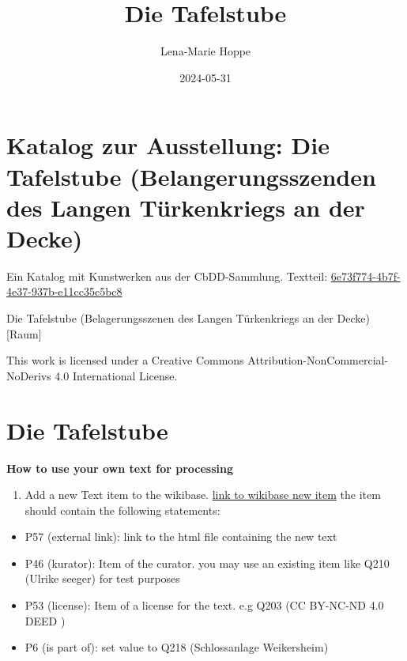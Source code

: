 \documentclass[
  letterpaper,
]{book}
\title{Die Tafelstube}
\author{Lena-Marie Hoppe}
\date{2024-05-31}
\providecommand{\tightlist}{%
  \setlength{\itemsep}{0pt}\setlength{\parskip}{0pt}}\usepackage{longtable,booktabs,array}
\renewcommand*\contentsname{Table of contents}
\newcommand\contentsname{Table of contents}
\begin{document}
\frontmatter
\maketitle

\renewcommand*\contentsname{Table of contents}
{
\setcounter{tocdepth}{2}
\tableofcontents
}
\mainmatter
{}

\chapter{Katalog zur Ausstellung: Die Tafelstube (Belangerungsszenden
des Langen Türkenkriegs an der
Decke)}\label{katalog-zur-ausstellung-die-tafelstube-belangerungsszenden-des-langen-tuxfcrkenkriegs-an-der-decke}

Ein Katalog mit Kunstwerken aus der CbDD-Sammlung. Textteil:
\href{https://www.deckenmalerei.eu/42d06165-58e7-4653-bfe4-3d5f7091fc33\#6e73f774-4b7f-4e37-937b-e11cc35c5bc8}{6e73f774-4b7f-4e37-937b-e11cc35c5bc8}

Die Tafelstube (Belagerungsszenen des Langen Türkenkriegs an der Decke)
{[}Raum{]}

This work is licensed under a Creative Commons
Attribution-NonCommercial-NoDerivs 4.0 International License.


\chapter{Die Tafelstube}\label{die-tafelstube}

\textbf{How to use your own text for processing}

\begin{enumerate}
\def\labelenumi{\arabic{enumi}.}
\tightlist
\item
  Add a new Text item to the wikibase.
  \href{https://computational-publishing-service.wikibase.cloud/wiki/Special:NewItem}{link
  to wikibase new item} the item should contain the following
  statements:
\end{enumerate}

\begin{itemize}
\tightlist
\item
  P57 (external link): link to the html file containing the new text
\item
  P46 (kurator): Item of the curator. you may use an existing item like
  Q210 (Ulrike seeger) for test purposes
\item
  P53 (license): Item of a license for the text. e.g Q203 (CC BY-NC-ND
  4.0 DEED )
\item
  P6 (is part of): set value to Q218 (Schlossanlage Weikersheim)
\end{itemize}
\end{document}
